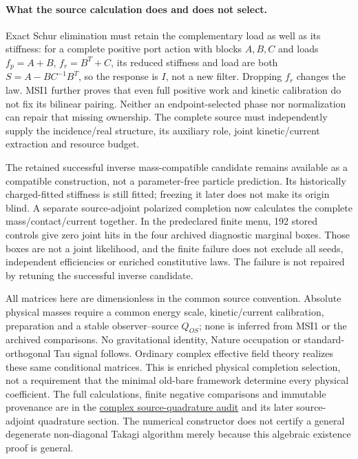 \documentclass[11pt]{article}
\begin{document}
\paragraph{What the source calculation does and does not select.}
Exact Schur elimination must retain the complementary load as well as its
stiffness: for a complete positive port action with blocks $A,B,C$ and loads
$f_p=A+B$, $f_r=B^T+C$, its reduced stiffness and load are both
$S=A-BC^{-1}B^T$, so the response is $I$, not a new filter.
Dropping $f_r$ changes the law. MSI1 further proves that even full positive
work and kinetic calibration do not fix its bilinear pairing. Neither an
endpoint-selected phase nor normalization can repair that missing ownership.
The complete source must independently supply the incidence/real structure,
its auxiliary role, joint kinetic/current extraction and resource budget.

The retained successful inverse mass-compatible candidate remains available
as a compatible construction, not a parameter-free particle prediction.
Its historically charged-fitted stiffness is still fitted; freezing it
later does not make its origin blind. A separate source-adjoint polarized
completion now calculates the complete mass/contact/current together. In
the predeclared finite menu, 192 stored controls give zero joint hits in the
four archived diagnostic marginal boxes. Those boxes are not a joint
likelihood, and the finite failure does not exclude all seeds, independent
efficiencies or enriched constitutive laws. The failure is not repaired by
retuning the successful inverse candidate.

All matrices here are dimensionless in the common source convention.
Absolute physical masses require a common energy scale, kinetic/current
calibration, preparation and a stable observer--source $Q_{OS}$; none is
inferred from MSI1 or the archived comparisons. No gravitational identity,
Nature occupation or standard-orthogonal Tau signal follows. Ordinary
complex effective field theory realizes these same conditional matrices.
This is enriched physical completion selection, not a requirement that
the minimal old-bare framework determine every physical coefficient.
The full calculations, finite negative comparisons and immutable provenance
are in the \href{https://github.com/tau-core-research/tau-core-theory/blob/main/docs/tau_core_seed_base_inverse_identifiability_and_constant_provenance_001.md#complex-source-quadrature-joint-bilinear-mass-hermitian-work-and-phase-nonselection}{complex source-quadrature audit}
and its later source-adjoint quadrature section. The numerical constructor
does not certify a general degenerate non-diagonal Takagi algorithm merely
because this algebraic existence proof is general.
\end{document}
